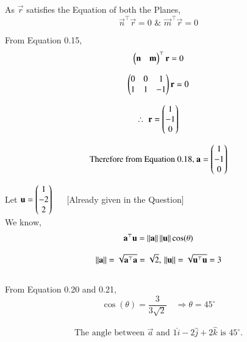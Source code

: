 \documentclass[journal]{IEEEtran}
\begin{document}
As $\vec{r}$ satisfies the Equation of both the Planes,
\begin{equation}
    \vec{n}^\top\vec{r}=0 \, \, \& \, \, \vec{m}^\top\vec{r}=0
\end{equation}

From Equation 0.15,
\begin{equation}
    \begin{pmatrix}\mathbf{n} & \mathbf{m}\end{pmatrix}^\top\mathbf{r}=0
\end{equation}

\begin{equation}
\begin{pmatrix} 0 & 0 & 1 \\ 1 & 1 & -1\end{pmatrix}\mathbf{r}  =0
\end{equation}

\begin{equation}
    \therefore \, \, \mathbf{r} = \begin{pmatrix} 1 \\ -1 \\ 0\end{pmatrix}
\end{equation}


\begin{equation}
\text{Therefore from Equation 0.18, } \mathbf{a} = \begin{pmatrix}1 \\ -1 \\ 0\end{pmatrix}    
\end{equation}

Let $\mathbf{u} = \begin{pmatrix}1 \\ -2 \\ 2\end{pmatrix}$ $\quad$ [Already given in the Question]\\

We know,
\begin{equation}
    \mathbf{a}^\top\mathbf{u} = \left\lVert\mathbf{a}\right\rVert\left\lVert\mathbf{u}\right\rVert\cos(\theta)
\end{equation}

\begin{equation}
    \left\lVert\mathbf{a}\right\rVert = \sqrt{\mathbf{a}^\top\mathbf{a}} = \sqrt{2}, \, \left\lVert\mathbf{u}\right\rVert = \sqrt{\mathbf{u}^\top\mathbf{u}} = 3
\end{equation}\\

From Equation 0.20 and 0.21,
\begin{equation}
    \cos(\theta) = \dfrac{3}{3\sqrt{2}} \quad \Rightarrow \theta = 45^\circ
\end{equation}

\begin{align}
  \boxed{\text{The angle between } \vec{a} \text{ and } 1\hat{i} -2\hat{j}+2\hat{k} \text{ is } 45^{\circ}.}  
\end{align}
\end{document}
